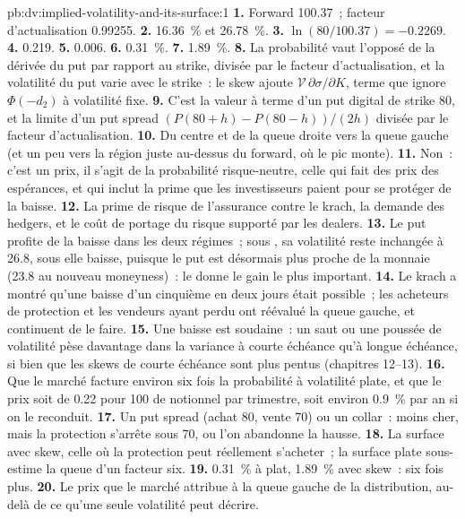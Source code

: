 \begin{solution}{pb:dv:implied-volatility-and-its-surface:1}
\textbf{1.} Forward 100.37~; facteur d'actualisation 0.99255.
\textbf{2.} 16.36~\% et 26.78~\%.
\textbf{3.} $\ln(80/100.37)=-0.2269$.
\textbf{4.} 0.219.
\textbf{5.} 0.006.
\textbf{6.} 0.31~\%.
\textbf{7.} 1.89~\%.
\textbf{8.} La probabilité vaut l'opposé de la dérivée du put par rapport au strike, divisée par le
facteur d'actualisation, et la volatilité du put varie avec le strike~: le skew ajoute $\mathcal V\,
\partial\sigma/\partial K$, terme que ignore $\Phi(-d_2)$ à volatilité fixe.
\textbf{9.} C'est la valeur à terme d'un put digital de strike 80, et la limite d'un put spread
$(P(80+h)-P(80-h))/(2h)$ divisée par le facteur d'actualisation.
\textbf{10.} Du centre et de la queue droite vers la queue gauche (et un peu vers la région
juste au-dessus du forward, où le pic monte).
\textbf{11.} Non~: c'est un prix, il s'agit de la probabilité risque-neutre, celle qui fait des prix des espérances,
et qui inclut la prime que les investisseurs paient pour se protéger de la baisse.
\textbf{12.} La prime de risque de l'assurance contre le krach, la demande des hedgers, et le coût
de portage du risque supporté par les dealers.
\textbf{13.} Le put profite de la baisse dans les deux régimes~; sous , sa volatilité reste
inchangée à 26.8, sous  elle baisse, puisque le put est désormais plus proche de la monnaie
(23.8 au nouveau moneyness)~: le  donne le gain le plus important.
\textbf{14.} Le krach a montré qu'une baisse d'un cinquième en deux jours était possible~; les acheteurs de
protection et les vendeurs ayant perdu ont réévalué la queue gauche, et continuent de le faire.
\textbf{15.} Une baisse est soudaine~: un saut ou une poussée de volatilité pèse davantage dans la variance
à courte échéance qu'à longue échéance, si bien que les skews de courte échéance sont plus pentus (chapitres 12--13).
\textbf{16.} Que le marché facture environ six fois la probabilité à volatilité plate, et que
le prix soit de 0.22 pour 100 de notionnel par trimestre, soit environ 0.9~\% par an si on le reconduit.
\textbf{17.} Un put spread (achat 80, vente 70) ou un collar~: moins cher, mais la protection s'arrête sous
70, ou l'on abandonne la hausse.
\textbf{18.} La surface avec skew, celle où la protection peut réellement s'acheter~; la
surface plate sous-estime la queue d'un facteur six.
\textbf{19.} 0.31~\% à plat, 1.89~\% avec skew~: six fois plus.
\textbf{20.} Le prix que le marché attribue à la queue gauche de la distribution, au-delà de ce qu'une seule
volatilité peut décrire.
\end{solution}

